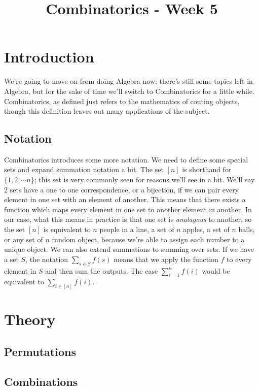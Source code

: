 \documentclass[11pt]{article}
\begin{document}
\title{Combinatorics - Week 5}
\maketitle

\section*{Introduction}
We're going to move on from doing Algebra now; there's still some topics left in Algebra, but for the sake of time we'll switch to Combinatorics for a little while. Combinatorics, as defined just refers to the mathematics of couting objects, though
this definition leaves out many applications of the subject. 

\subsection*{Notation}
Combinatorics introduces some more notation. We need to define some special sets and expand summation notation a bit. The set $[n]$ is shorthand for $\{ 1, 2, \cdots n \}$; this set is very commonly seen for reasons we'll see in a bit. We'll say 2 sets have a one to one correspondence, or a bijection,  if we can pair every element in one set with an element of another. This means that there exists a function which maps every element in one set to another element in another. In our case, 
what this means in practice is that one set is \textit{analagous} to another, so the set $[n]$ is equivalent to $n$ people in a line, a set of $n$ apples, a set of $n$ balls, or any set of $n$ random object, because we're able to assign each number to a unique object. We can also extend summations to summing over sets. If we have a set $S$, the notation $\sum_{s \in S} f(s)$ means that we apply the function $f$ to every element in $S$ and then sum the outputs. The case $\sum_{i=1}^n f(i)$ would be equivalent to $\sum_{i \in [n]} f(i)$.
\section{Theory}

\subsection{Permutations}

\subsection{Combinations}
\end{document}
